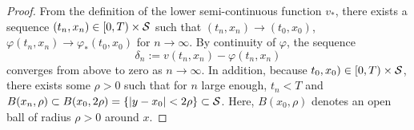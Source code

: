 \begin{proof}
    From the definition of the lower semi-continuous function $v_*$, there exists a sequence $(t_n,x_n) \in [0,T) \times \mathcal{S}$ such that $(t_n,x_n) \rightarrow (t_0,x_0)$, $\varphi(t_n,x_n) \rightarrow \varphi_*(t_0,x_0)$ for $n \rightarrow \infty$. By continuity of $\varphi$, the sequence 
    \begin{equation}
        \delta_n := v(t_n,x_n) - \varphi(t_n,x_n) 
        \label{eqn: Theorem 4.9, definition of delta_n}
    \end{equation}
    converges from above to zero as $n \rightarrow \infty$. In addition, because $t_0,x_0) \in [0,T)\times \mathcal{S}$, there exists some $\rho>0$ such that for $n$ large enough, $t_n<T$ and $B(x_n,\rho) \subset B(x_0, 2 \rho) = \{|y-x_0| < 2 \rho\} \subset \mathcal{S}$. Here, $B(x_0,\rho)$ denotes an open ball of radius $\rho>0$ around $x$. 


\end{proof}
